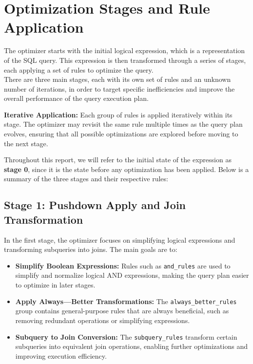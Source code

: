 \documentclass[a4paper,12pt]{scrreprt}
\begin{document}
\chapter{Optimization Stages and Rule Application} \label{chap:rules}
\thispagestyle{fancy}
The optimizer starts with the initial logical expression, which is a representation of the SQL query. This expression is then transformed through a series of stages, each applying a set of rules to optimize the query. \\
There are three main stages, each with its own set of rules and an unknown number of iterations, in order to target specific inefficiencies and improve the overall performance of the query execution plan. 


\textbf{Iterative Application:} Each group of rules is applied iteratively within its stage. The optimizer may revisit the same rule multiple times as the query plan evolves, ensuring that all possible optimizations are explored before moving to the next stage.

Throughout this report, we will refer to the initial state of the expression as \textbf{stage 0}, since it is the state before any optimization has been applied.
Below is a summary of the three stages and their respective rules:

\section{Stage 1: Pushdown Apply and Join Transformation}
In the first stage, the optimizer focuses on simplifying logical expressions and transforming subqueries into joins. The main goals are to:
\begin{itemize}
    \item \textbf{Simplify Boolean Expressions:} Rules such as \texttt{and\_rules} are used to simplify and normalize logical AND expressions, making the query plan easier to optimize in later stages.
    \item \textbf{Apply Always---Better Transformations:} The \texttt{always\_better\_rules} group contains general-purpose rules that are always beneficial, such as removing redundant operations or simplifying expressions.
    \item \textbf{Subquery to Join Conversion:} The \texttt{subquery\_rules} transform certain subqueries into equivalent join operations, enabling further optimizations and improving execution efficiency.
\end{itemize}
\end{document}
